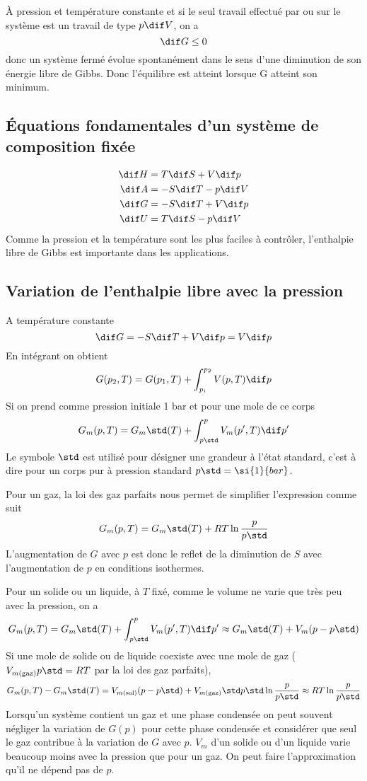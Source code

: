 À pression et température constante et si le seul travail effectué par
ou sur le système est un travail de type $p\dif V$, on a
\[ \dif G \leq 0 \]
donc un système fermé évolue spontanément dans le sens
d'une diminution de son énergie libre de Gibbs.
Donc l'équilibre est atteint lorsque G atteint son minimum.

\subsection{Équations fondamentales d'un système de composition fixée}
\begin{align}
  \nonumber
  \dif H & = T\dif S+V\dif p\\
  \nonumber
  \dif A & = -S\dif T -p\dif V\\
  \label{eq:fondG}
  \dif G & = -S\dif T +V\dif p\\
  \nonumber
  \dif U & = T\dif S-p\dif V
\end{align}
Comme la pression et la température sont les plus faciles à contrôler,
l'enthalpie libre de Gibbs est importante dans les applications.

\subsection{Variation de l'enthalpie libre avec la pression}
A température constante
\[ \dif G = -S\dif T+V\dif p = V\dif p \]
En intégrant on obtient
\[ G(p_2,T) = G(p_1,T)+\int_{p_i}^{p_2}V(p,T)\dif p \]
Si on prend comme pression initiale 1 bar et pour une mole de ce corps
\[ G_m(p,T) = G_m\std(T)+\int_{p\std}^{p}V_m(p',T)\dif p' \]
Le symbole $\std$ est utilisé pour désigner une grandeur à l'état standard,
c'est à dire pour un corps pur à pression standard $p\std = \si{1}{bar}$.

Pour un gaz, la loi des gaz parfaits nous permet de simplifier l'expression
comme suit
\[ G_m(p,T) = G_m\std(T)+RT \ln \frac{p}{p\std} \]
L'augmentation de $G$ avec $p$ est donc le reflet de la diminution de $S$
avec l'augmentation de $p$ en conditions isothermes.

Pour un solide ou un liquide, à $T$ fixé,
comme le volume ne varie que très peu avec la pression, on a
\[ G_m(p,T) = G_m\std(T)+\int_{p\std}^{p}V_m(p',T)\dif p'
\approx G_m\std(T)+V_m(p-p\std) \]
Si une mole de solide ou de liquide coexiste avec une mole de gaz
($V_{m(\mathrm{gaz})} p\std = RT$ par la loi des gaz parfaits),
\[ G_m(p,T) - G_m\std(T) = V_{m(\mathrm{sol})}(p-p\std)+
V_{m(\mathrm{gaz})}\std p\std\ln \frac{p}{p\std}
\approx RT \ln \frac{p}{p\std} \]
Lorsqu'un système contient un gaz et une phase condensée
on peut souvent négliger la variation de $G(p)$ pour cette phase condensée
et considérer que seul le gaz contribue à la variation de $G$ avec $p$.
$V_m$ d'un solide ou d'un liquide varie beaucoup
moins avec la pression que pour un gaz.
On peut faire l'approximation qu'il ne dépend pas de $p$.

